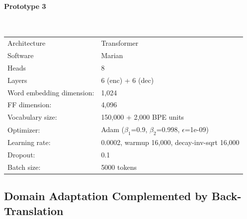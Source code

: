 \documentclass[a4paper,11pt]{article}
\begin{document}
\paragraph{Prototype 3} ~\\

\begin{tabular}{ll}
Architecture & Transformer \\
Software & Marian \\
Heads & 8 \\
Layers & 6 (enc) + 6 (dec) \\
Word embedding dimension: & 1,024\\
FF dimension: & 4,096\\
Vocabulary size: & 150,000 + 2,000 BPE units\\
Optimizer: & Adam ($\beta_1$=0.9, $\beta_2$=0.998, $\epsilon$=1e-09)\\
Learning rate: &  0.0002, warmup 16,000, decay-inv-sqrt 16,000\\
Dropout: & 0.1\\
Batch size: & 5000 tokens\\
\end{tabular}

% 


\subsection{Domain Adaptation Complemented by Back-Translation}
\end{document}

